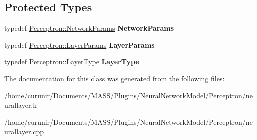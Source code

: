 \subsection*{Protected Types}
\begin{DoxyCompactItemize}
\item 
typedef \hyperlink{struct_perceptron_1_1_network_params}{Perceptron\+::\+Network\+Params} {\bfseries Network\+Params}\hypertarget{class_neural_layer_ac3d37a368a77b07386981ecd0e0e55bb}{}\label{class_neural_layer_ac3d37a368a77b07386981ecd0e0e55bb}

\item 
typedef \hyperlink{struct_perceptron_1_1_layer_params}{Perceptron\+::\+Layer\+Params} {\bfseries Layer\+Params}\hypertarget{class_neural_layer_a9a46b30c0d9d329e3d2d943ae628683f}{}\label{class_neural_layer_a9a46b30c0d9d329e3d2d943ae628683f}

\item 
typedef Perceptron\+::\+Layer\+Type {\bfseries Layer\+Type}\hypertarget{class_neural_layer_a236cebae478f3f55e8256ce1b554bcb3}{}\label{class_neural_layer_a236cebae478f3f55e8256ce1b554bcb3}

\end{DoxyCompactItemize}


The documentation for this class was generated from the following files\+:\begin{DoxyCompactItemize}
\item 
/home/curunir/\+Documents/\+M\+A\+S\+S/\+Plugins/\+Neural\+Network\+Model/\+Perceptron/neurallayer.\+h\item 
/home/curunir/\+Documents/\+M\+A\+S\+S/\+Plugins/\+Neural\+Network\+Model/\+Perceptron/neurallayer.\+cpp\end{DoxyCompactItemize}
